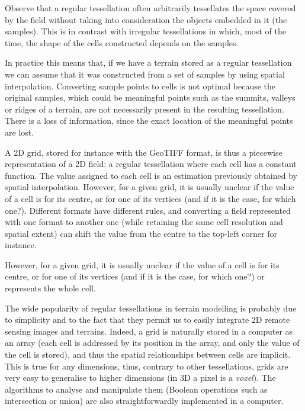 %

Observe that a regular tessellation often arbitrarily tessellates the space covered by the field without taking into consideration the objects embedded in it (the samples). 
This is in contrast with irregular tessellations in which, most of the time, the shape of the cells constructed depends on the samples.

In practice this means that, if we have a terrain stored as a regular tessellation we can assume that it was constructed from a set of samples by using spatial interpolation.
Converting sample points to cells is not optimal because the original samples, which could be meaningful points such as the summits, valleys or ridges of a terrain, are not necessarily present in the resulting tessellation. 
There is a loss of information, since the exact location of the meaningful points are lost.

%

\begin{floatbox}
\begin{kaobox-practice}[frametitle=\faCog\ Concrete example: a 2D grid]
  A 2D grid, stored for instance with the GeoTIFF format, is thus a piecewise representation of a 2D field: a regular tessellation where each cell has a constant function.
  The value assigned to each cell is an estimation previously obtained by spatial interpolation.
  However, for a given grid, it is usually unclear if the value of a cell is for its centre, or for one of its vertices (and if it is the case, for which one?).
  Different formats have different rules, and converting a field represented with one format to another one (while retaining the same cell resolution and spatial extent) can shift the value from the centre to the top-left corner for instance.
\end{kaobox-practice}
  However, for a given grid, it is usually unclear if the value of a cell is for its centre, or for one of its vertices (and if it is the case, for which one?) or represents the whole cell.
\end{floatbox}

%

The wide popularity of regular tessellations in terrain modelling is probably due to simplicity and to the fact that they permit us to easily integrate 2D remote sensing images and terrains.
Indeed, a grid is naturally stored in a computer as an array (each cell is addressed by its position in the array, and only the value of the cell is stored), and thus the spatial relationships between cells are implicit. 
This is true for any dimensions, thus, contrary to other tessellations, grids are very easy to generalise to higher dimensions (in 3D a pixel is a \emph{voxel}).%
The algorithms to analyse and manipulate them (Boolean operations such as intersection or union) are also straightforwardly implemented in a computer. 

